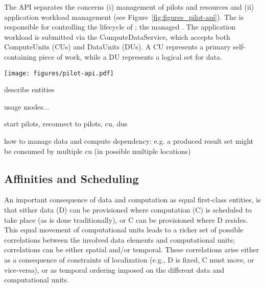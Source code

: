 \documentclass{sig-alternate}
\begin{document}
The API separates the concerns (i) management of pilots and resources and (ii)
application workload management (see Figure~\ref{fig:figures_pilot-api}). The
\pilotcomputeservice is responsible for controlling the lifecycle of
\pilotcomputes; the \pilotdataservice managed \pilotdata. The application
workload is submitted via the ComputeDataService, which accepts both
ComputeUnits (CUs) and DataUnits (DUs). A CU represents a primary
self-containing piece of work, while a DU represents a logical set for data.

\begin{figure*}[htbp]
	\centering
		\texttt{[image: figures/pilot-api.pdf]}
	\caption{Control Flow Pilot-API: The API exposes two primary functionalities: The PilotComputeService and PilotDataService are used for the management of \pilotcomputes and \pilotdata. The application workload is submitted via the \computedataservice.}
	\label{fig:figures_pilot-api}
\end{figure*}

describe entities

usage modes...

start pilots, reconnect to pilots, cu, dus


how to manage data and compute dependency: e.g. a produced result set might be 
consumed by multiple cu (in possible multiple locations)



\subsection{Affinities and Scheduling}




An important consequence of data and computation as equal first-class
entities, is that either data (D) can be provisioned where computation
(C) is scheduled to take place (as is done traditionally), or C can be
provisioned where D resides. This equal movement of computational
units leads to a richer set of possible correlations between the
involved data elements and computational units; correlations can be
either spatial and/or temporal. These correlations arise either as a
consequence of constraints of localization (e.g., D is fixed, C must
move, or vice-versa), or as temporal ordering imposed on the different
data and computational units.
\end{document}
